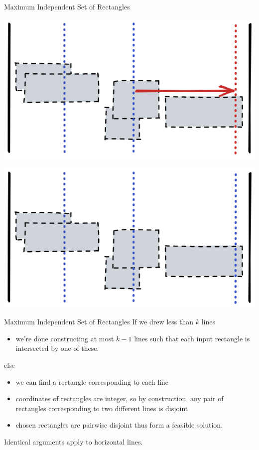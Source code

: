 \documentclass[handout,usenames,dvipsnames]{beamer}
\begin{document}
\begin{frame}{Maximum Independent Set of Rectangles}
    \begin{minipage}{0.45\textwidth}
        
        \includegraphics[width=\textwidth]{l1c3.png}
    \end{minipage}\hfill
    \begin{minipage}{0.45\textwidth}
        \begin{center}
            \includegraphics[width=\textwidth]{l1c4.png}
        \end{center}
    \end{minipage}
\end{frame}

\begin{frame}{Maximum Independent Set of Rectangles}
    If we drew less than $k$ lines
    \begin{itemize}
        \item we're done constructing at most $k - 1$ lines such that each input rectangle is intersected by one of these.
    \end{itemize}
    \pause
    else
    \pause
    \begin{itemize}
        \item we can find a rectangle corresponding to each line
        \pause
        \item coordinates of rectangles are integer, so by construction, any pair of rectangles corresponding to two different lines is disjoint
        \pause
        \item chosen rectangles are pairwise disjoint thus form a feasible solution.
        \pause
    \end{itemize}
    Identical arguments apply to horizontal lines.
\end{frame}
\end{document}
